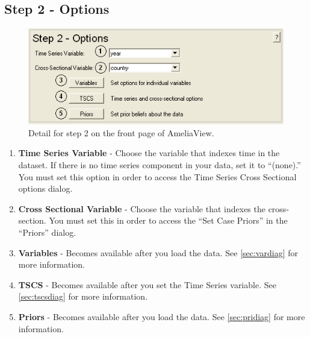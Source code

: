 \documentclass[12pt,titlepage]{article}
\begin{document}
\subsection{Step 2 - Options}
\label{sec:step2}
\begin{figure}[ht]
  \centering \includegraphics[scale=.75]{step2.png}
  \caption{Detail for step 2 on the front page of AmeliaView.}
\end{figure}
\begin{enumerate}
\item \textbf{Time Series Variable} - Choose the variable that indexes
  time in the dataset.  If there is no time series component in your
  data, set it to ``(none).''  You must set this option in order to
  access the Time Series Cross Sectional options dialog.
\item \textbf{Cross Sectional Variable} - Choose the variable that
  indexes the cross-section.  You must set this in order to access the
  ``Set Case Priors'' in the ``Priors'' dialog.
\item \textbf{Variables} - Becomes available after you load the data.
  See \ref{sec:vardiag} for more information.
\item \textbf{TSCS} - Becomes available after you set the Time Series
  variable.  See \ref{sec:tscsdiag} for more information.
\item \textbf{Priors} - Becomes available after you load the data.
  See \ref{sec:pridiag} for more information.
\end{enumerate}
\end{document}
